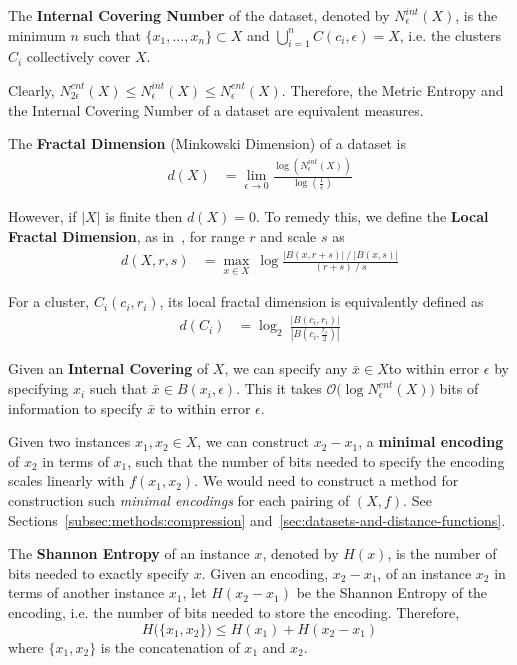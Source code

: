 The \textbf{Internal Covering Number} of the dataset, denoted by $N_{\epsilon}^{int}(X)$, is the minimum $n$ such that $\{x_1, \dots, x_n\} \subset X$ and $\bigcup_{i = 1}^{n} C(c_i, \epsilon) = X$, i.e. the clusters $C_i$ collectively cover $X$.

Clearly, $N_{2\epsilon}^{ent}(X) \leq N_{\epsilon}^{int}(X) \leq N_{\epsilon}^{ent}(X)$.
Therefore, the Metric Entropy and the Internal Covering Number of a dataset are equivalent measures.

The \textbf{Fractal Dimension} (Minkowski Dimension) of a dataset is
\begin{align*}
    d(X) &= \lim_{\epsilon \rightarrow 0} \frac{\log(N_{\epsilon}^{int}(X))}{\log(\frac{1}{\epsilon})}
\end{align*}

However, if $|X|$ is finite then $d(X) = 0$.
To remedy this, we define the \textbf{Local Fractal Dimension}, as in~\cite{berger2020levenshtein}, for range $r$ and scale $s$ as
\begin{align*}
    d(X, r, s) &= \max_{x \in X} \ \log \frac{|B(x, r + s)| \ / \ |B(x, s)|}{(r + s) \ / \ s}
\end{align*}

For a cluster, $C_i(c_i, r_i)$, its local fractal dimension is equivalently defined as
\begin{align}
    \label{eq:local-fractal-dimension}
    d(C_i) &= \log_2 \ \frac{|B(c_i, r_i)|}{|B(c_i, \frac{r_i}{2})|}
\end{align}

Given an \textbf{Internal Covering} of $X$, we can specify any $\bar{x} \in X$to within error $\epsilon$ by specifying $x_i$ such that $\bar{x} \in B(x_i, \epsilon)$.
This it takes $\mathcal{O} \big( \log N_{\epsilon}^{ent}(X) \big)$ bits of information to specify $\bar{x}$ to within error $\epsilon$.

Given two instances $x_1, x_2 \in X$, we can construct $x_2 - x_1$, a \textbf{minimal encoding} of $x_2$ in terms of $x_1$, such that the number of bits needed to specify the encoding scales linearly with $f(x_1, x_2)$.
We would need to construct a method for construction such \textit{minimal encodings} for each pairing of $(X, f)$.
See Sections~\ref{subsec:methods:compression} and~\ref{sec:datasets-and-distance-functions}.

The \textbf{Shannon Entropy} of an instance $x$, denoted by $H(x)$, is the number of bits needed to exactly specify $x$.
Given an encoding, $x_2 - x_1$, of an instance $x_2$ in terms of another instance $x_1$, let $H(x_2 - x_1)$ be the Shannon Entropy of the encoding, i.e. the number of bits needed to store the encoding.
Therefore, \[ H \big( \{ x_1, x_2 \} \big) \leq H(x_1) + H(x_2 - x_1) \] where $\{ x_1, x_2 \}$ is the concatenation of $x_1$ and $x_2$.

